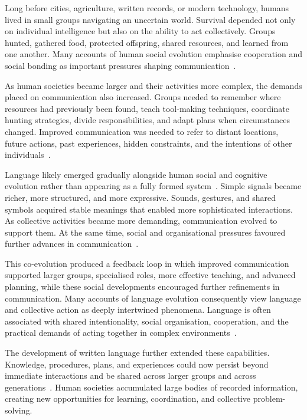 Long before cities, agriculture, written records, or modern technology, humans lived in small groups navigating an uncertain world. Survival depended not only on individual intelligence but also on the ability to act collectively. Groups hunted, gathered food, protected offspring, shared resources, and learned from one another. Many accounts of human social evolution emphasise cooperation and social bonding as important pressures shaping communication~\cite{tomasello2008origins,dunbar1996grooming}.

As human societies became larger and their activities more complex, the demands placed on communication also increased. Groups needed to remember where resources had previously been found, teach tool-making techniques, coordinate hunting strategies, divide responsibilities, and adapt plans when circumstances changed. Improved communication was needed to refer to distant locations, future actions, past experiences, hidden constraints, and the intentions of other individuals~\cite{clark1996usinglanguage,tomasello2008origins}.

Language likely emerged gradually alongside human social and cognitive evolution rather than appearing as a fully formed system~\cite{johansson2005origins}. Simple signals became richer, more structured, and more expressive. Sounds, gestures, and shared symbols acquired stable meanings that enabled more sophisticated interactions. As collective activities became more demanding, communication evolved to support them. At the same time, social and organisational pressures favoured further advances in communication~\cite{tomasello2008origins,dunbar1996grooming}.

This co-evolution produced a feedback loop in which improved communication supported larger groups, specialised roles, more effective teaching, and advanced planning, while these social developments encouraged further refinements in communication. Many accounts of language evolution consequently view language and collective action as deeply intertwined phenomena. Language is often associated with shared intentionality, social organisation, cooperation, and the practical demands of acting together in complex environments~\cite{clark1996usinglanguage,tomasello2008origins,dunbar1996grooming,johansson2005origins}.

The development of written language further extended these capabilities. Knowledge, procedures, plans, and experiences could now persist beyond immediate interactions and be shared across larger groups and across generations~\cite{fischer2004history}. Human societies accumulated large bodies of recorded information, creating new opportunities for learning, coordination, and collective problem-solving.

